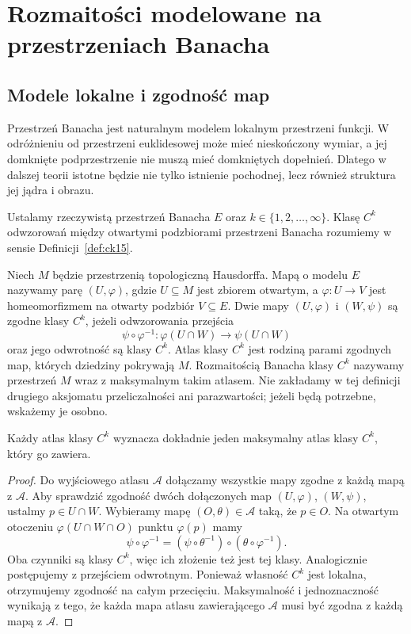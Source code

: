 \section{Rozmaitości modelowane na przestrzeniach Banacha}
\label{sec:fsg-banach-manifolds}

\subsection{Modele lokalne i zgodność map}

Przestrzeń Banacha jest naturalnym modelem lokalnym przestrzeni
funkcji. W odróżnieniu od przestrzeni euklidesowej może mieć
nieskończony wymiar, a jej domknięte podprzestrzenie nie muszą
mieć domkniętych dopełnień. Dlatego w dalszej teorii istotne
będzie nie tylko istnienie pochodnej, lecz również struktura
jej jądra i obrazu.

Ustalamy rzeczywistą przestrzeń Banacha $E$ oraz
$k\in\{1,2,\ldots,\infty\}$. Klasę $C^k$ odwzorowań między
otwartymi podzbiorami przestrzeni Banacha rozumiemy w sensie
Definicji~\ref{def:ck15}.

\begin{definicja}
\label{def:fsg-chart}
Niech $M$ będzie przestrzenią topologiczną Hausdorffa.
Mapą o modelu $E$ nazywamy parę $(U,\varphi)$, gdzie
$U\subseteq M$ jest zbiorem otwartym, a
$\varphi:U\to V$ jest homeomorfizmem na otwarty podzbiór
$V\subseteq E$. Dwie mapy $(U,\varphi)$ i $(W,\psi)$
są zgodne klasy $C^k$, jeżeli odwzorowania przejścia
\[
 \psi\circ\varphi^{-1}:\varphi(U\cap W)\longrightarrow
 \psi(U\cap W)
\]
oraz jego odwrotność są klasy $C^k$.
Atlas klasy $C^k$ jest rodziną parami zgodnych map,
których dziedziny pokrywają $M$.
Rozmaitością Banacha klasy $C^k$ nazywamy przestrzeń
$M$ wraz z maksymalnym takim atlasem.
Nie zakładamy w tej definicji drugiego aksjomatu przeliczalności
ani parazwartości; jeżeli będą potrzebne, wskażemy je osobno.
\end{definicja}

\begin{stwierdzenie}
\label{prop:fsg-maximal-atlas}
Każdy atlas klasy $C^k$ wyznacza dokładnie jeden
maksymalny atlas klasy $C^k$, który go zawiera.
\end{stwierdzenie}
\begin{proof}
Do wyjściowego atlasu $\mathcal A$ dołączamy wszystkie mapy
zgodne z każdą mapą z $\mathcal A$. Aby sprawdzić zgodność
dwóch dołączonych map $(U,\varphi)$, $(W,\psi)$,
ustalmy $p\in U\cap W$. Wybieramy mapę $(O,\theta)\in\mathcal A$
taką, że $p\in O$. Na otwartym otoczeniu $\varphi(U\cap W\cap O)$
punktu $\varphi(p)$ mamy
\[
 \psi\circ\varphi^{-1}
 =(\psi\circ\theta^{-1})\circ(\theta\circ\varphi^{-1}).
\]
Oba czynniki są klasy $C^k$, więc ich złożenie też jest tej
klasy. Analogicznie postępujemy z przejściem odwrotnym.
Ponieważ własność $C^k$ jest lokalna, otrzymujemy zgodność
na całym przecięciu. Maksymalność i jednoznaczność wynikają
z tego, że każda mapa atlasu zawierającego $\mathcal A$
musi być zgodna z każdą mapą z $\mathcal A$.
\end{proof}

